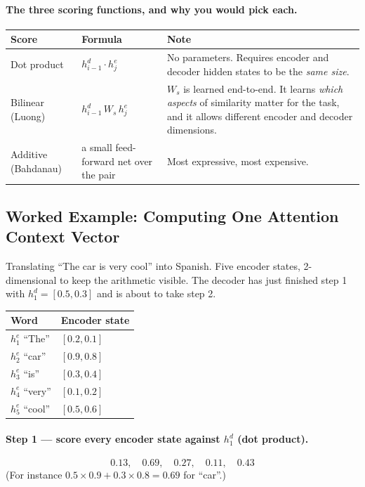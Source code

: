 \documentclass[11pt,a4paper]{article}
\begin{document}
\paragraph{The three scoring functions, and why you would pick each.}
\begin{center}
\begin{tabularx}{\textwidth}{lYY}
\textbf{Score} & \textbf{Formula} & \textbf{Note} \\
\hline
Dot product & $h_{i-1}^d \cdot h_j^e$ & No parameters. Requires encoder and decoder hidden
states to be the \emph{same size}. \\
Bilinear (Luong) & $h_{i-1}^d\, W_s\, h_j^e$ & $W_s$ is learned end-to-end. It learns
\emph{which aspects} of similarity matter for the task, and it allows different encoder and
decoder dimensions. \\
Additive (Bahdanau) & a small feed-forward net over the pair & Most expressive, most
expensive. \\
\end{tabularx}
\end{center}

\subsection{Worked Example: Computing One Attention Context Vector}

Translating ``The car is very cool'' into Spanish. Five encoder states, 2-dimensional to keep
the arithmetic visible. The decoder has just finished step 1 with $h_1^d = [0.5, 0.3]$ and is
about to take step 2.

\begin{center}
\begin{tabular}{ll}
\textbf{Word} & \textbf{Encoder state} \\
\hline
$h_1^e$ ``The'' & $[0.2, 0.1]$ \\
$h_2^e$ ``car'' & $[0.9, 0.8]$ \\
$h_3^e$ ``is'' & $[0.3, 0.4]$ \\
$h_4^e$ ``very'' & $[0.1, 0.2]$ \\
$h_5^e$ ``cool'' & $[0.5, 0.6]$ \\
\end{tabular}
\end{center}

\paragraph{Step 1 --- score every encoder state against $h_1^d$ (dot product).}
\[
0.13,\quad 0.69,\quad 0.27,\quad 0.11,\quad 0.43
\]
(For instance $0.5{\times}0.9 + 0.3{\times}0.8 = 0.69$ for ``car''.)
\end{document}
